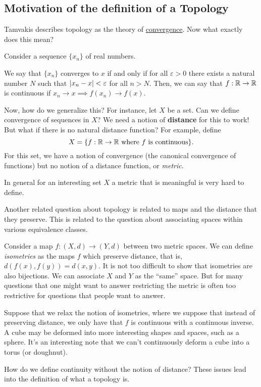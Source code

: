 \subsection{Motivation of the definition of a Topology}

Tamvakis describes topology as the theory of \underline{convergence}. Now what exactly does this mean?

Consider a sequence $\{x_n\}$ of real numbers.

We say that $\{x_n\}$ converges to $x$ if and only if for all $\varepsilon > 0$ there exists a natural number $N$ such that $|x_n - x| < \varepsilon$ for all $n > N$. Then, we can say that $f: \mathbb{R} \to \mathbb{R}$ is continuous if $x_n \to x \implies f(x_n) \to f(x)$.

Now, how do we generalize this? For instance, let $X$ be a set. Can we define convergence of sequences in $X$? We need a notion of \textbf{distance} for this to work! But what if there is no natural distance function? For example, define 
\[X = \{f: \mathbb{R} \to \mathbb{R}~\text{where }f\text{ is continuous}\}.\] 
For this set, we have a notion of convergence (the canonical convergence of functions) but no notion of a distance function, or \textit{metric}.

In general for an interesting set $X$ a metric that is meaningful is very hard to define.

Another related question about topology is related to maps and the distance that they preserve. This is related to the question about associating spaces within various equivalence classes.

Consider a map $f:(X, d) \to (Y, d)$ between two metric spaces. We can define \textit{isometries} as the maps $f$ which preserve distance, that is, $d(f(x), f(y)) = d(x, y)$. It is not too difficult to show that isometries are also bijections. We can associate $X$ and $Y$ as the ``same'' space. But for many questions that one might want to answer restricting the metric is often too restrictive for questions that people want to answer.

Suppose that we relax the notion of isometries, where we suppose that instead of preserving distance, we only have that $f$ is continuous with a continuous inverse. A cube may be deformed into more interesting shapes and spaces, such as a sphere. It's an interesting note that we can't continuously deform a cube into a torus (or doughnut).

\begin{question}
How do we define continuity without the notion of distance? These issues lead into the definition of what a topology is.
\end{question}

